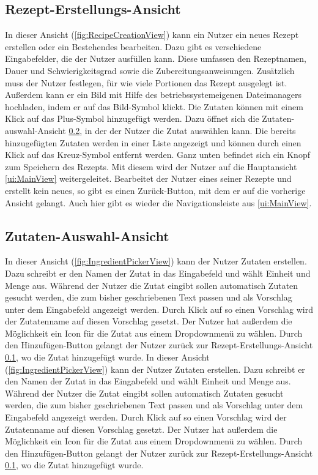 \documentclass[parskip=full]{scrartcl}
\begin{document}
\subsection{Rezept-Erstellungs-Ansicht}
\label{ui:RecipeCreationView}
In dieser Ansicht (\autoref{fig:RecipeCreationView}) kann ein Nutzer ein neues Rezept erstellen oder ein Bestehendes bearbeiten. Dazu gibt es verschiedene Eingabefelder, die der Nutzer ausfüllen kann. Diese umfassen den Rezeptnamen, Dauer und Schwierigkeitsgrad sowie die Zubereitungsanweisungen. Zusätzlich muss der Nutzer festlegen, für wie viele Portionen das Rezept ausgelegt ist. Außerdem kann er ein Bild mit Hilfe des betriebssystemeigenen Dateimanagers hochladen, indem er auf das Bild-Symbol klickt.
Die Zutaten können mit einem Klick auf das Plus-Symbol hinzugefügt werden. Dazu öffnet sich die Zutaten-auswahl-Ansicht \ref{ui:IngredientPickerView}, in der der Nutzer die Zutat auswählen kann. Die bereits hinzugefügten Zutaten werden in einer Liste angezeigt und können durch einen Klick auf das Kreuz-Symbol entfernt werden. Ganz unten befindet sich ein Knopf zum Speichern des Rezepts. Mit diesem wird der Nutzer auf die Hauptansicht \ref{ui:MainView} weitergeleitet. Bearbeitet der Nutzer eines seiner Rezepte und erstellt kein neues, so gibt es einen Zurück-Button, mit dem er auf die vorherige Ansicht gelangt. Auch hier gibt es wieder die Navigationsleiste aus \ref{ui:MainView}.

\subsection{Zutaten-Auswahl-Ansicht}
\label{ui:IngredientPickerView}
In dieser Ansicht (\autoref{fig:IngredientPickerView}) kann der Nutzer Zutaten erstellen. Dazu schreibt er den Namen der Zutat in das Eingabefeld und wählt Einheit und Menge aus. Während der Nutzer die Zutat eingibt sollen automatisch Zutaten gesucht werden, die zum bisher geschriebenen Text passen und als Vorschlag unter dem Eingabefeld angezeigt werden. Durch Klick auf so einen Vorschlag wird der Zutatenname auf diesen Vorschlag gesetzt. Der Nutzer hat außerdem die Möglichkeit ein Icon für die Zutat aus einem Dropdownmenü zu wählen. Durch den Hinzufügen-Button gelangt der Nutzer zurück zur Rezept-Erstellungs-Ansicht \ref{ui:RecipeCreationView}, wo die Zutat hinzugefügt wurde.
In dieser Ansicht (\autoref{fig:IngredientPickerView}) kann der Nutzer Zutaten erstellen. Dazu schreibt er den Namen der Zutat in das Eingabefeld und wählt Einheit und Menge aus. Während der Nutzer die Zutat eingibt sollen automatisch Zutaten gesucht werden, die zum bisher geschriebenen Text passen und als Vorschlag unter dem Eingabefeld angezeigt werden. Durch Klick auf so einen Vorschlag wird der Zutatenname auf diesen Vorschlag gesetzt. Der Nutzer hat außerdem die Möglichkeit ein Icon für die Zutat aus einem Dropdownmenü zu wählen. Durch den Hinzufügen-Button gelangt der Nutzer zurück zur Rezept-Erstellungs-Ansicht \ref{ui:RecipeCreationView}, wo die Zutat hinzugefügt wurde.
\end{document}
